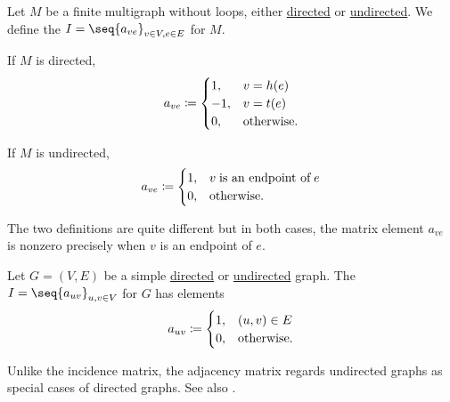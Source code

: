 \begin{definition}\label{def:multigraph_incidence_matrix}
  Let \( M \) be a finite multigraph without loops, either \hyperref[def:graph/quiver]{directed} or \hyperref[def:graph/undirected_multigraph]{undirected}. We define the  \( I = \seq{ a_{ve} }_{v \in V, e \in E} \) for \( M \).

  \smallskip
  \begin{minipage}[t]{0.45\textwidth}
    If \( M \) is directed,
    \begin{equation*}
      a_{ve} \coloneqq \begin{cases}
        1,  & v = h(e) \\
        -1, & v = t(e) \\
        0,  & \T{otherwise.}
      \end{cases}
    \end{equation*}
  \end{minipage}
  \hspace{0.02\textwidth}
  \begin{minipage}[t]{0.45\textwidth}
    If \( M \) is undirected,
    \begin{equation*}
      a_{ve} \coloneqq \begin{cases}
        1,  & v \T{is an endpoint of} e \\
        0,  & \T{otherwise.}
      \end{cases}
    \end{equation*}
  \end{minipage}
  \smallskip

  The two definitions are quite different but in both cases, the matrix element \( a_{ve} \) is nonzero precisely when \( v \) is an endpoint of \( e \).
\end{definition}

\begin{definition}\label{def:graph_adjacency_matrix}
  Let \( G = (V, E) \) be a simple \hyperref[def:graph/simple_directed]{directed} or \hyperref[def:graph/simple_directed]{undirected} graph. The  \( I = \seq{ a_{uv} }_{u, v \in V} \) for \( G \) has elements
  \begin{equation*}
    a_{uv} \coloneqq \begin{cases}
      1,  &(u, v) \in E \\
      0,  &\T{otherwise.}
    \end{cases}
  \end{equation*}

  Unlike the incidence matrix, the adjacency matrix regards undirected graphs as special cases of directed graphs. See also .
\end{definition}

